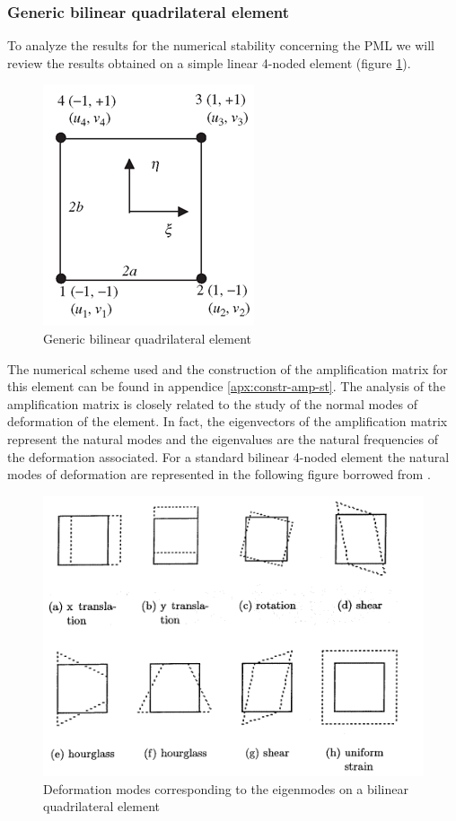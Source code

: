 \subsubsection{Generic bilinear quadrilateral element}
To analyze the results for the numerical stability concerning the PML we will review the results obtained on a simple linear 4-noded element (figure \ref{fig:4nodes}).
\begin{figure}[H]
\centering
\includegraphics[scale=0.5]{images/square2d.png}
\caption{Generic bilinear quadrilateral element}
\label{fig:4nodes}
\end{figure}
The numerical scheme used and the construction of the amplification matrix for this element can be found in appendice \ref{apx:constr-amp-st}. 
The analysis of the amplification matrix is closely related to the study of the normal modes of deformation of the element. In fact, the eigenvectors of the amplification matrix represent the natural modes and the eigenvalues are the natural frequencies of the deformation associated. For a standard bilinear 4-noded element the natural modes of deformation are represented in the following figure borrowed from \cite{Ling2002}.
\begin{figure}[H]
\centering
\includegraphics[scale=0.5]{images/def-modes.png}
\caption{Deformation modes corresponding to the eigenmodes on a bilinear quadrilateral element}
\label{fig:def-modes}
\end{figure}
